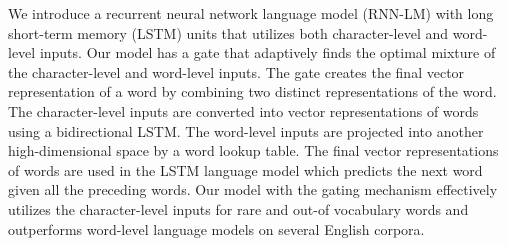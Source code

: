 We introduce a recurrent neural network language model (RNN-LM) with long short-term memory (LSTM) units that utilizes both character-level and word-level inputs. Our model has a gate that adaptively finds the optimal mixture of the character-level and word-level inputs.  The gate creates the final vector representation of a word by combining two distinct representations of the word. The character-level inputs are converted into vector representations of words using a bidirectional LSTM. The word-level inputs are projected into another high-dimensional space by a word lookup table. The final vector representations of words are used in the LSTM language model which predicts the next word given all the preceding words. Our model with the gating mechanism effectively utilizes the character-level inputs for rare and out-of vocabulary words and outperforms word-level language models on several English corpora.
